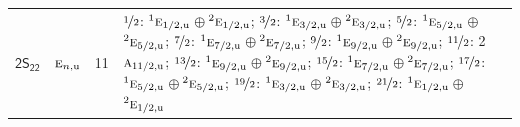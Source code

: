 \documentclass[10pt,a4paper]{article}
\numberwithin{equation}{section}
\newcommand{\grp}[1]{\mathsf{#1}}
\newcommand{\irr}[1]{\text{\normalfont\scshape #1}}
\newcommand{\conjpair}[1]{{}^{#1}}
\newcommand{\ptag}[1]{\mathrm{#1}}
\newlength{\fillwidth}\newlength{\cellwidth}\newlength{\colwidth}
\begin{document}
{\begin{longtable}{@{}llr>{\RaggedRight\arraybackslash}p{\fillwidth}@{}}
\href{2S22.pdf}{$\grp{2S_{22}}$} & $\irr{e}_{n,\ptag{u}}$ & 11 & $\nicefrac{1}{2}$: $\conjpair{1}\irr{e}_{1/2,\ptag{u}}$${}\oplus{}$$\conjpair{2}\irr{e}_{1/2,\ptag{u}}$; $\nicefrac{3}{2}$: $\conjpair{1}\irr{e}_{3/2,\ptag{u}}$${}\oplus{}$$\conjpair{2}\irr{e}_{3/2,\ptag{u}}$; $\nicefrac{5}{2}$: $\conjpair{1}\irr{e}_{5/2,\ptag{u}}$${}\oplus{}$$\conjpair{2}\irr{e}_{5/2,\ptag{u}}$; $\nicefrac{7}{2}$: $\conjpair{1}\irr{e}_{7/2,\ptag{u}}$${}\oplus{}$$\conjpair{2}\irr{e}_{7/2,\ptag{u}}$; $\nicefrac{9}{2}$: $\conjpair{1}\irr{e}_{9/2,\ptag{u}}$${}\oplus{}$$\conjpair{2}\irr{e}_{9/2,\ptag{u}}$; $\nicefrac{11}{2}$: 2$\irr{a}_{11/2,\ptag{u}}$; $\nicefrac{13}{2}$: $\conjpair{1}\irr{e}_{9/2,\ptag{u}}$${}\oplus{}$$\conjpair{2}\irr{e}_{9/2,\ptag{u}}$; $\nicefrac{15}{2}$: $\conjpair{1}\irr{e}_{7/2,\ptag{u}}$${}\oplus{}$$\conjpair{2}\irr{e}_{7/2,\ptag{u}}$; $\nicefrac{17}{2}$: $\conjpair{1}\irr{e}_{5/2,\ptag{u}}$${}\oplus{}$$\conjpair{2}\irr{e}_{5/2,\ptag{u}}$; $\nicefrac{19}{2}$: $\conjpair{1}\irr{e}_{3/2,\ptag{u}}$${}\oplus{}$$\conjpair{2}\irr{e}_{3/2,\ptag{u}}$; $\nicefrac{21}{2}$: $\conjpair{1}\irr{e}_{1/2,\ptag{u}}$${}\oplus{}$$\conjpair{2}\irr{e}_{1/2,\ptag{u}}$\\

\end{longtable}}
\end{document}
